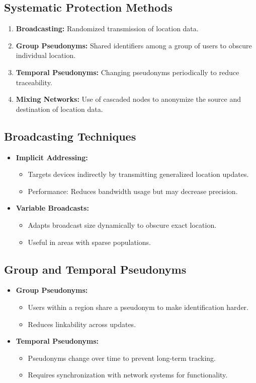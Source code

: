 \documentclass{article}
\begin{document}
\subsection{Systematic Protection Methods}
\begin{enumerate}
    \item \textbf{Broadcasting:} Randomized transmission of location data.
    \item \textbf{Group Pseudonyms:} Shared identifiers among a group of users to obscure individual location.
    \item \textbf{Temporal Pseudonyms:} Changing pseudonyms periodically to reduce traceability.
    \item \textbf{Mixing Networks:} Use of cascaded nodes to anonymize the source and destination of location data.
\end{enumerate}

\subsection{Broadcasting Techniques}
\begin{itemize}
    \item \textbf{Implicit Addressing:}
    \begin{itemize}
        \item Targets devices indirectly by transmitting generalized location updates.
        \item Performance: Reduces bandwidth usage but may decrease precision.
    \end{itemize}
    \item \textbf{Variable Broadcasts:}
    \begin{itemize}
        \item Adapts broadcast size dynamically to obscure exact location.
        \item Useful in areas with sparse populations.
    \end{itemize}
\end{itemize}

\subsection{Group and Temporal Pseudonyms}
\begin{itemize}
    \item \textbf{Group Pseudonyms:}
    \begin{itemize}
        \item Users within a region share a pseudonym to make identification harder.
        \item Reduces linkability across updates.
    \end{itemize}
    \item \textbf{Temporal Pseudonyms:}
    \begin{itemize}
        \item Pseudonyms change over time to prevent long-term tracking.
        \item Requires synchronization with network systems for functionality.
    \end{itemize}
\end{itemize}
\end{document}
